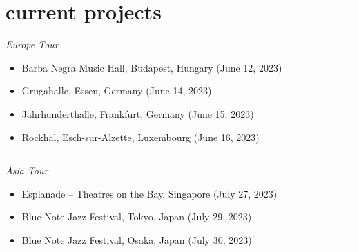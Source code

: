 \documentclass[12pt]{../templates/classes/res}
\begin{document}
\begin{resume}
\begin{minipage}[t]{0.35\linewidth}
{\begin{minipage}[t]{1.0\linewidth}
\begin{flushleft}
\begin{itemize}
    \end{itemize}
  \end{flushleft}
  \vspace{-8pt}
\end{minipage}
}
\end{minipage}
\hfill
\begin{minipage}[t]{0.35\linewidth}
  \section{current projects}
  \vspace{10pt}
  \footnotesize{
\begin{minipage}[t]{1.0\linewidth}
  \vspace{1pt}
  \raggedright{\emph{Europe Tour}}
\end{minipage}
\begin{minipage}[t]{1.0\linewidth}
  \begin{flushleft}
  \vspace{2pt}
    \begin{itemize}
      \item Barba Negra Music Hall, Budapest, Hungary (June 12, 2023)
\item Grugahalle, Essen, Germany (June 14, 2023)
\item Jahrhunderthalle, Frankfurt, Germany (June 15, 2023)
\item Rockhal, Esch-sur-Alzette, Luxembourg (June 16, 2023)

    \end{itemize}
  \end{flushleft}
  \vspace{-8pt}
\end{minipage}
\rule{1.0\textwidth}{0.1pt}
\begin{minipage}[t]{1.0\linewidth}
  \vspace{1pt}
  \raggedright{\emph{Asia Tour}}
\end{minipage}
\begin{minipage}[t]{1.0\linewidth}
  \begin{flushleft}
  \vspace{2pt}
    \begin{itemize}
      \item Esplanade – Theatres on the Bay, Singapore (July 27, 2023)
\item Blue Note Jazz Festival, Tokyo, Japan (July 29, 2023)
\item Blue Note Jazz Festival, Osaka, Japan (July 30, 2023)

    \end{itemize}
  \end{flushleft}
  \vspace{-8pt}
\end{minipage}
}
\end{minipage}
\end{resume} 
\end{document}
